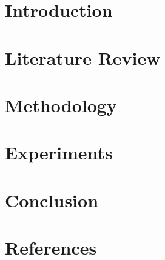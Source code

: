 \documentclass[14pt]{extreport}
\begin{document}
\chapter{Introduction}

\chapter{Literature Review}

\chapter{Methodology}

\chapter{Experiments}

\chapter{Conclusion}

\chapter{References}
\end{document}
